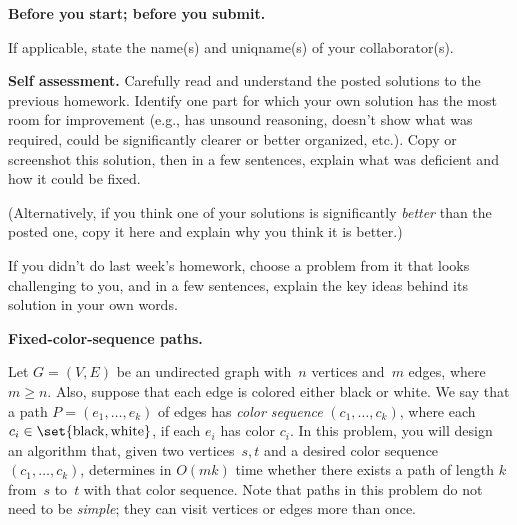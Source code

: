 \documentclass[11pt,addpoints]{exam}
\begin{document}
\hwpreface

\begin{questions}

  \addtocounter{question}{-1}
  \question \textbf{Before you start; before you submit.}

      

    If applicable, state the name(s) and uniqname(s) of your collaborator(s).

    \begin{solution}
       
    \end{solution}


\question[10] \textbf{Self assessment.} \nopagebreak
  Carefully read and understand the posted solutions to the previous homework.
  Identify one part for which your own solution has the most room for improvement (e.g., has unsound reasoning, doesn’t show what was required, could be significantly clearer or better organized, etc.).
  Copy or screenshot this solution, then in a few sentences, explain what was deficient and how it could be fixed.

  (Alternatively, if you think one of your solutions is significantly \emph{better} than the posted one, copy it here and explain why you think it is better.)

  If you didn't do last week's homework, choose a problem from it that looks challenging to you, and in a few sentences, explain the key ideas behind its solution in your own words.

  \begin{solution}

  
  
        
  \end{solution}

\question \textbf{Fixed-color-sequence paths.} 
    
 
  Let $G=(V,E)$ be an undirected graph with~$n$ vertices and~$m$ edges, where $m \geq n$.
  Also, suppose that each edge is colored either black or white.
  We say that a path $P=(e_{1},\dots,e_{k})$ of edges has \emph{color sequence} $(c_{1},\dots,c_{k})$, where each $c_{i}\in\set{\text{black},\text{white}}$, if each $e_{i}$ has color $c_{i}$.
      In this problem, you will design an algorithm that, given two vertices~$s,t$ and a desired color sequence $(c_{1},\dots,c_{k})$, determines in $O(mk)$ time whether there exists a path of length $k$ from~$s$ to~$t$ with that color sequence.
  Note that paths in this problem do not need to be \emph{simple}; they can visit vertices or edges more than once.


\end{questions}
\end{document}
